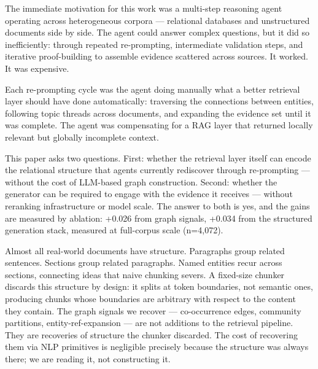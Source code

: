 \documentclass[
]{article}
\begin{document}
The immediate motivation for this work was a multi-step reasoning agent
operating across heterogeneous corpora --- relational databases and
unstructured documents side by side. The agent could answer complex
questions, but it did so inefficiently: through repeated re-prompting,
intermediate validation steps, and iterative proof-building to assemble
evidence scattered across sources. It worked. It was expensive.

Each re-prompting cycle was the agent doing manually what a better
retrieval layer should have done automatically: traversing the
connections between entities, following topic threads across documents,
and expanding the evidence set until it was complete. The agent was
compensating for a RAG layer that returned locally relevant but globally
incomplete context.

This paper asks two questions. First: whether the retrieval layer itself
can encode the relational structure that agents currently rediscover
through re-prompting --- without the cost of LLM-based graph
construction. Second: whether the generator can be required to engage
with the evidence it receives --- without reranking infrastructure or
model scale. The answer to both is yes, and the gains are measured by
ablation: +0.026 from graph signals, +0.034 from the structured
generation stack, measured at full-corpus scale (n=4,072).

Almost all real-world documents have structure. Paragraphs group related
sentences. Sections group related paragraphs. Named entities recur
across sections, connecting ideas that naive chunking severs. A
fixed-size chunker discards this structure by design: it splits at token
boundaries, not semantic ones, producing chunks whose boundaries are
arbitrary with respect to the content they contain. The graph signals we
recover --- co-occurrence edges, community partitions,
entity-ref-expansion --- are not additions to the retrieval pipeline.
They are recoveries of structure the chunker discarded. The cost of
recovering them via NLP primitives is negligible precisely because the
structure was always there; we are reading it, not constructing it.
\end{document}
